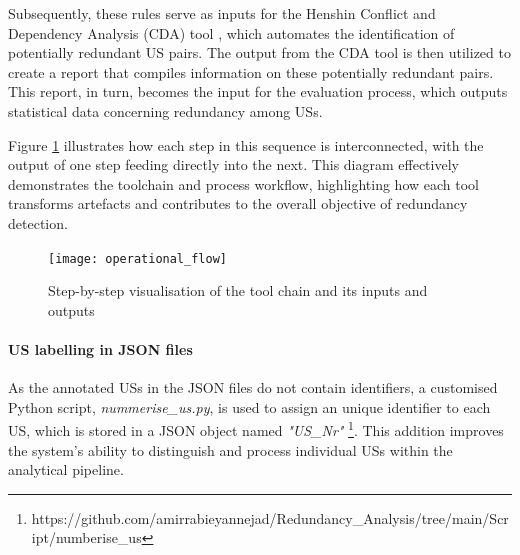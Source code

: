 Subsequently, these rules serve as inputs for the Henshin Conflict and Dependency Analysis (CDA) tool \cite{mens2007analysing}, which automates the identification of potentially redundant US pairs. The output from the CDA tool is then utilized to create a report that compiles information on these potentially redundant pairs. This report, in turn, becomes the input for the evaluation process, which outputs statistical data concerning redundancy among USs.

Figure \ref{fig:operational_flow} illustrates how each step in this sequence is interconnected, with the output of one step feeding directly into the next. This diagram effectively demonstrates the toolchain and process workflow, highlighting how each tool transforms artefacts and contributes to the overall objective of redundancy detection.
\begin{figure}[h]
	\centering 
	\texttt{[image: operational\_flow]}
	\caption{Step-by-step visualisation of the tool chain and its inputs and outputs}\label{fig:operational_flow}
\end{figure}
\paragraph{US labelling in JSON files}\label{workflow_nummerize_us}
As the annotated USs in the JSON files do not contain identifiers, a customised Python script, \textit{nummerise\_us.py}, is used to assign an unique identifier to each US, which is stored in a JSON object named \textit{"US\_Nr"} \footnote{https://github.com/amirrabieyannejad/Redundancy\_Analysis/tree/main/Script/numberise\_us}. This addition improves the system's ability to distinguish and process individual USs within the analytical pipeline.

